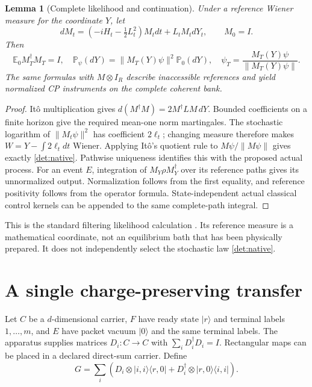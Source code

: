 \documentclass[11pt,oneside,openany]{book}
\newtheorem{lemma}[theorem]{Lemma}
\theoremstyle{definition}
\theoremstyle{remark}\newtheorem{remark}[theorem]{Remark}
\begin{document}
\begin{lemma}[Complete likelihood and continuation]\label{det:likelihood}
Under a reference Wiener measure for the coordinate $Y$, let
\[
 dM_t=(-iH_t-\tfrac12L_t^2)M_tdt+L_tM_tdY_t,
 \qquad M_0=I.
\]
Then
\begin{equation}
 \mathbb E_0 M_T^\dagger M_T=I,
 \quad \mathbb P_\psi(dY)=\|M_T(Y)\psi\|^2\mathbb P_0(dY),
 \quad \psi_T=\frac{M_T(Y)\psi}{\|M_T(Y)\psi\|}.             \label{det:likelihood-eq}
\end{equation}
The same formulas with $M\otimes I_R$ describe inaccessible references
and yield normalized CP instruments on the complete coherent bank.
\end{lemma}
\begin{proof}
It\^o multiplication gives
$d(M^\dagger M)=2M^\dagger LM\,dY$. Bounded coefficients on a finite
horizon give the required mean-one norm martingales. The stochastic
logarithm of $\|M_t\psi\|^2$ has coefficient $2\ell_t$; changing measure
therefore makes $W=Y-\int2\ell_tdt$ Wiener. Applying It\^o's quotient
rule to $M\psi/\|M\psi\|$ gives exactly \eqref{det:native}.
Pathwise uniqueness identifies this with the proposed actual process.
For an event $E$, integration of $M_Y\rho M_Y^\dagger$ over its
reference paths gives its unnormalized output. Normalization follows
from the first equality, and reference positivity follows from the
operator formula. State-independent actual classical control kernels
can be appended to the same complete-path integral.
\end{proof}

This is the standard filtering likelihood calculation \cite{Filtering}.
Its reference measure is a mathematical coordinate, not an equilibrium
bath that has been physically prepared. It does not independently
select the stochastic law \eqref{det:native}.

\section{A single charge-preserving transfer}

Let $C$ be a $d$-dimensional carrier, $F$ have ready state $|r\rangle$
and terminal labels $1,\ldots,m$, and $E$ have packet vacuum $|0\rangle$
and the same terminal labels. The apparatus supplies matrices
$D_i:C\to C$ with $\sum_iD_i^\dagger D_i=I$. Rectangular maps can be
placed in a declared direct-sum carrier. Define
\begin{equation}
 G=\sum_i\left(D_i\otimes|i,i\rangle\langle r,0|
              +D_i^\dagger\otimes|r,0\rangle\langle i,i|\right).
                                                        \label{det:converter}
\end{equation}
\end{document}
